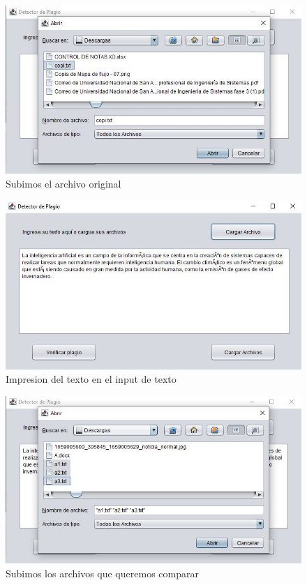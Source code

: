 \documentclass{article}
\begin{document}
	\begin{figure}[H]
		\centering
		\caption{Subimos el archivo original}
		\includegraphics[width=1\textwidth,keepaspectratio]{img/Ejec2.jpg}
	\end{figure}
	\begin{figure}[H]
		\centering
		\caption{Impresion del texto en el input de texto}
		\includegraphics[width=1\textwidth,keepaspectratio]{img/Ejec3.jpg}
	\end{figure}
	\begin{figure}[H]
		\centering
		\caption{Subimos los archivos que queremos comparar}
		\includegraphics[width=1\textwidth,keepaspectratio]{img/Ejec4.jpg}
	\end{figure}
\end{document}
